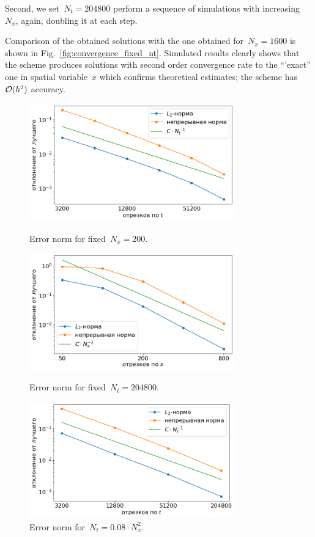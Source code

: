 Second, we set~$N_t = 204800$ perform a sequence  of simulations with
increasing~$N_x$, again, doubling it at each step.

Comparison of the obtained solutions with the one obtained for~$N_x = 1600$
is shown in Fig.~\ref{fig:convergence_fixed_nt}.
Simulated results clearly shows that the scheme produces solutions
with second order convergence rate to the ``'exact'' one in spatial variable~$x$ which
confirms theoretical estimates; the scheme has~${\mathcal{O}} (h^2)$ accuracy.

\begin{figure}[!tp]
	\centering
	\includegraphics[width=0.79\textwidth]{figures/convergence_fixed_nx.png}
	\vspace{-0.2cm}
	\caption{Error norm for fixed~$N_x = 200$.}
	\label{fig:convergence_fixed_nx}
	\vspace{0.6cm}
	
	\includegraphics[width=0.79\textwidth]{figures/convergence_fixed_nt.png}
	\vspace{-0.2cm}
	\caption{Error norm for fixed~$N_t = 204800$.}
	\label{fig:convergence_fixed_nt}
	\vspace{0.6cm}
	
	\includegraphics[width=0.79\textwidth]{figures/convergence_connected.png}
	\vspace{-0.2cm}
	\caption{Error norm for~$N_t = 0.08 \cdot N_x^2$.}
	\label{fig:convergence_connected}
\end{figure}

